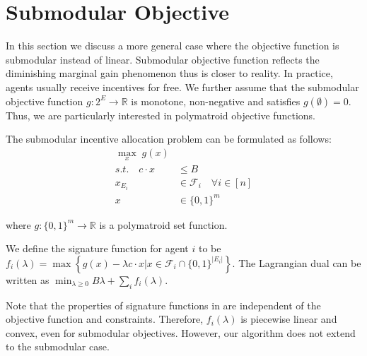 \documentclass{article}
\newcommand{\R}{\mathbb{R}}
\begin{document}
\section{Submodular Objective}

In this section we discuss a more general case where the objective function is submodular instead of linear.
Submodular objective function reflects the diminishing marginal gain phenomenon thus is closer to reality. In practice, agents usually receive incentives for free. We further assume that the submodular objective function $g:2^E\to \R$ is monotone, non-negative and satisfies $g(\emptyset)=0$. Thus, we are particularly interested in polymatroid objective functions.

The submodular incentive allocation problem can be formulated as follows:
\begin{align*}
    \max_x \; g(x) \\
    s.t.   \quad c \cdot x &\leq B \\
    x_{E_i}&\in \mathcal{F}_i \quad\forall i\in [n]\\
    x&\in \{0,1\}^m
\end{align*}


where $g:\{0,1\}^m \to \R$ is a polymatroid set function.



We define the signature function for agent $i$ to be $f_i(\lambda) = \max\left\{g(x)-\lambda c\cdot x | x\in \mathcal{F}_i \cap \{0,1 \}^{|E_i|}\right\}$. The Lagrangian dual can be written as $\min_{\lambda\geq 0} B\lambda + \sum_i f_i(\lambda)$. 

Note that the properties of signature functions in  are independent of the objective function and constraints. Therefore, $f_i(\lambda)$ is piecewise linear and convex, even for submodular objectives. However, our algorithm does not extend to the submodular case.
\end{document}
